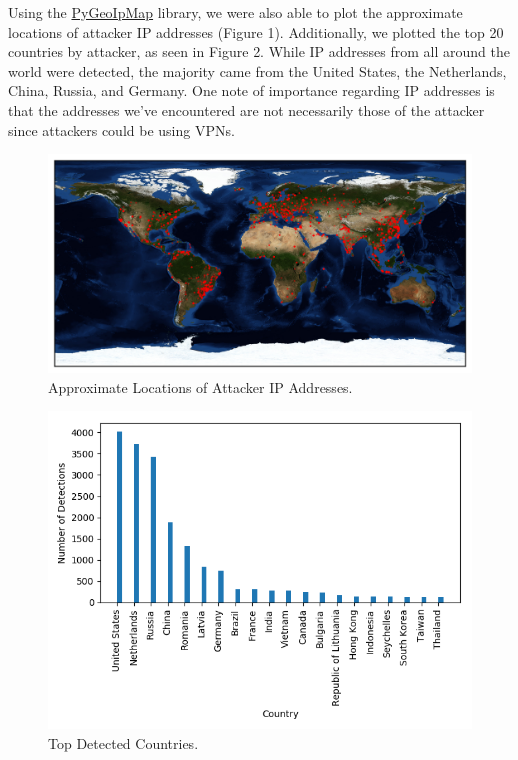 Using the \href{https://github.com/pieqq/PyGeoIpMap}{PyGeoIpMap} library, we were also able to plot the approximate locations of attacker IP addresses (Figure 1). Additionally, we plotted the top 20 countries by attacker, as seen in Figure 2. While IP addresses from all around the world were detected, the majority came from the United States, the Netherlands, China, Russia, and Germany. One note of importance regarding IP addresses is that the addresses we've encountered are not necessarily those of the attacker since attackers could be using VPNs.

\begin{figure}[H]
	\includegraphics[width=\linewidth]{map.png}
	\caption{Approximate Locations of Attacker IP Addresses.}
	\label{fig:map}
\end{figure}


\begin{figure}[H]
	\includegraphics[width=\linewidth]{top_countries.png}
	\caption{Top Detected Countries.}
	\label{fig:top-countries}
\end{figure}

